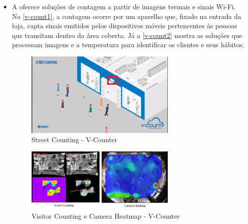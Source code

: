 \begin{itemize}
\item A  oferece soluções de contagem a partir de imagens termais e sinais Wi-Fi. Na \autoref{v-count1}, a contagem ocorre por um
aparelho que, fixado na entrada da loja, capta sinais emitidos pelos dispositivos móveis pertencentes  às pessoas que transitam dentro da área coberta. Já a \autoref{v-count2} mostra as soluções que processam imagens e a temperatura para identificar os clientes e seus hábitos.

\begin{figure}[htb]
  \caption{\label{v-count1}Street Counting - V-Counter}
  \begin{center}
    \includegraphics[width=0.70\textwidth]{img/v-count.png}
  \end{center}
\end{figure}

\begin{figure}[htb]
  \caption{\label{v-count2}Visitor Counting e Camera Heatmap - V-Counter}
  \begin{center}
    \includegraphics[width=0.70\textwidth]{img/termal-vcount.png}
  \end{center}
\end{figure}

\end{itemize}

